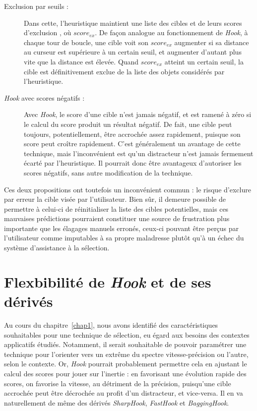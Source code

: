 	\begin{description}
		\item[Exclusion par seuils :] Dans cette, l'heuristique maintient une liste des cibles et de leurs \og scores d'exclusion \fg{}, où $score_{ex}$. De façon analogue au fonctionnement de \emph{Hook}, à chaque tour de boucle, une cible voit son $score_{ex}$ augmenter si sa distance au curseur est supérieure à un certain seuil, et augmenter d'autant plus vite que la distance est élevée. Quand $score_{ex}$ atteint un certain seuil, la cible est définitivement exclue de la liste des objets considérés par l'heuristique.
		\item[\emph{Hook} avec scores négatifs :] Avec \emph{Hook}, le score d'une cible n'est jamais négatif, et est ramené à zéro si le calcul du score produit un résultat négatif. De fait, une cible peut toujours, potentiellement, être accrochée assez rapidement, puisque son score peut croître rapidement. C'est généralement un avantage de cette technique, mais l'inconvénient est qu'un distracteur n'est jamais fermement écarté par l'heuristique. Il pourrait donc être avantageux d'autoriser les scores négatifs, sans autre modification de la technique.
	\end{description}
	
	Ces deux propositions ont toutefois un inconvénient commun : le risque d'exclure par erreur la cible visée par l'utilisateur. Bien sûr, il demeure possible de permettre à celui-ci de réinitialiser la liste des cibles potentielles, mais ces mauvaises prédictions pourraient constituer une source de frustration plus importante que les élagages manuels erronés, ceux-ci pouvant être perçus par l'utilisateur comme imputables à sa propre maladresse plutôt qu'à un échec du système d'assistance à la sélection.
	
\section{Flexbibilité de \emph{Hook} et de ses dérivés}
	Au cours du chapitre~\ref{chap1}, nous avons identifié des caractéristiques souhaitables pour une technique de sélection, eu égard aux besoins des contextes applicatifs étudiés. Notamment, il serait souhaitable de pouvoir paramétrer une technique pour l'orienter vers un extrême du spectre vitesse-précision ou l'autre, selon le contexte. Or, \emph{Hook} pourrait probablement permettre cela en ajustant le calcul des scores pour jouer sur \og l'inertie \fg{} : en favorisant une évolution rapide des scores, on favorise la vitesse, au détriment de la précision, puisqu'une cible accrochée peut être décrochée au profit d'un distracteur, et vice-versa. Il en va naturellement de même des dérivés \emph{SharpHook}, \emph{FastHook} et \emph{BaggingHook}.
	
